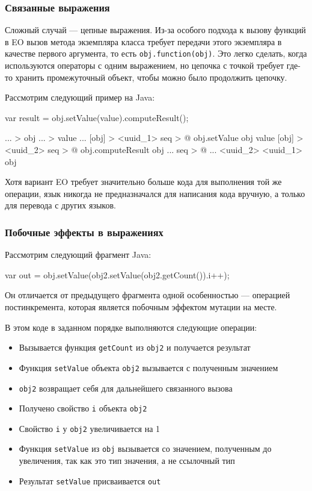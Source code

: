\documentclass[oneside,final,14pt,a4paper]{extreport}
\theoremstyle{definition}
\theoremstyle{remark}
\theoremstyle{remark}
\begin{document}
\subsubsection{Связанные выражения}

Сложный случай — цепные выражения. Из-за особого подхода к вызову функций в EO вызов метода экземпляра класса требует передачи этого экземпляра в качестве первого аргумента, то есть \texttt{obj.function(obj)}. Это легко сделать, когда используются операторы с одним выражением, но цепочка с точкой требует где-то хранить промежуточный объект, чтобы можно было продолжить цепочку.

Рассмотрим следующий пример на Java:

\begin{ffcode}
var result = obj.setValue(value).computeResult();
\end{ffcode}

\begin{ffcode}
... > obj
... > value
...
[obj] > <uuid_1>
  seq > @
    obj.setValue obj value
[obj] > <uuid_2>
  seq > @
    obj.computeResult obj
...
seq > @
  ...
  <uuid_2>
    <uuid_1>
      obj
\end{ffcode}

Хотя вариант EO требует значительно больше кода для выполнения той же операции, язык никогда не предназначался для написания кода вручную, а только для перевода с других языков.


\subsubsection{Побочные эффекты в выражениях}

Рассмотрим следующий фрагмент Java:

\begin{ffcode}
var out = obj.setValue(obj2.setValue(obj2.getCount()).i++);
\end{ffcode}

Он отличается от предыдущего фрагмента одной особенностью — операцией постинкремента, которая является побочным эффектом мутации на месте.

В этом коде в заданном порядке выполняются следующие операции:
\begin{itemize}
    \item Вызывается функция \texttt{getCount} из \texttt{obj2} и получается результат
    \item Функция \texttt{setValue} объекта \texttt{obj2} вызывается с полученным значением
    \item \texttt{obj2} возвращает себя для дальнейшего связанного вызова
    \item Получено свойство \texttt{i} объекта \texttt{obj2}
    \item Свойство \texttt{i} у \texttt{obj2} увеличивается на 1
    \item Функция \texttt{setValue} из \texttt{obj} вызывается со значением, полученным до увеличения, так как это тип значения, а не ссылочный тип
    \item Результат \texttt{setValue} присваивается \texttt{out}
\end{itemize}
\end{document}
